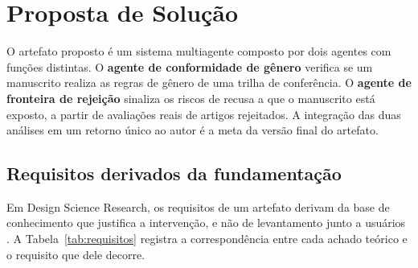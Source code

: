 \chapter{Proposta de Solução}\label{chap:proposta_solucao}


O artefato proposto é um sistema multiagente composto por dois agentes com funções distintas. O \textbf{agente de conformidade de gênero} verifica se um manuscrito realiza as regras de gênero de uma trilha de conferência. O \textbf{agente de fronteira de rejeição} sinaliza os riscos de recusa a que o manuscrito está exposto, a partir de avaliações reais de artigos rejeitados. A integração das duas análises em um retorno único ao autor é a meta da versão final do artefato.






\section{Requisitos derivados da fundamentação}
\label{sec:requisitos}

Em Design Science Research, os requisitos de um artefato derivam da base de conhecimento que justifica a intervenção, e não de levantamento junto a usuários \cite{Hevner2004}. A Tabela~\ref{tab:requisitos} registra a correspondência entre cada achado teórico e o requisito que dele decorre.

